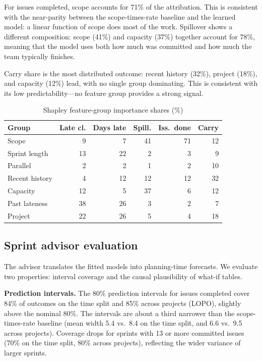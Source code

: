 \documentclass[conference]{IEEEtran}
\begin{document}
For issues completed, scope accounts for 71\% of the attribution.
This is consistent with the near-parity between the scope-times-rate baseline and the learned model: a linear function of scope does most of the work.
Spillover shows a different composition: scope (41\%) and capacity (37\%) together account for 78\%, meaning that the model uses both how much was committed and how much the team typically finishes.

Carry share is the most distributed outcome: recent history (32\%), project (18\%), and capacity (12\%) lead, with no single group dominating.
This is consistent with its low predictability---no feature group provides a strong signal.

\begin{table}[!htb]
\centering\scriptsize
\caption{Shapley feature-group importance shares (\%)}
\label{tab:shapley}
\setlength{\tabcolsep}{2.0pt}
\begin{tabular}{@{}lrrrrr@{}}
\toprule
Group & Late cl. & Days late & Spill. & Iss.\ done & Carry\\
\midrule
Scope & 9 & 7 & 41 & 71 & 12\\
Sprint length & 13 & 22 & 2 & 3 & 9\\
Parallel & 2 & 2 & 1 & 2 & 10\\
Recent history & 4 & 12 & 12 & 12 & 32\\
Capacity & 12 & 5 & 37 & 6 & 12\\
Past lateness & 38 & 26 & 3 & 2 & 7\\
Project & 22 & 26 & 5 & 4 & 18\\
\bottomrule
\end{tabular}
\end{table}

\subsection{Sprint advisor evaluation}
\label{sec:advisor}

The advisor translates the fitted models into planning-time forecasts.
We evaluate two properties: interval coverage and the causal plausibility of what-if tables.

\textbf{Prediction intervals.}
The 80\% prediction intervals for issues completed cover 84\% of outcomes on the time split and 85\% across projects (LOPO), slightly above the nominal 80\%.
The intervals are about a third narrower than the scope-times-rate baseline (mean width 5.4 vs.\ 8.4 on the time split, and 6.6 vs.\ 9.5 across projects).
Coverage drops for sprints with 13 or more committed issues (70\% on the time split, 80\% across projects), reflecting the wider variance of larger sprints.
\end{document}
